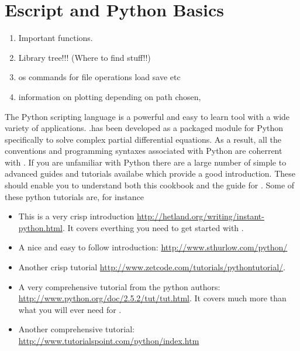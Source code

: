 
%
%
%

\section{Escript and Python Basics} \label{sec:escpybas}

\begin{enumerate}
 \item Important functions.
 \item Library tree!!! (Where to find stuff!!)
 \item os commands for file operations load save etc
 \item information on plotting depending on path chosen,
\end{enumerate}

The Python scripting language is a powerful and easy to learn tool with a wide variety of applications. \ESCRIPT.has been developed as a packaged module for Python specifically to solve complex partial differential equations. As a result, all the conventions and programming syntaxes associated with Python are coherrent with \ESCRIPT. If you are unfamiliar with Python there are a large number of simple to advanced guides and tutorials availabe which provide a good introduction. These should enable you to understand both this cookbook and the guide for \ESCRIPT. Some of these python tutorials are, for instance
\begin{itemize}
\item This is a very crisp introduction \url{http://hetland.org/writing/instant-python.html}. It covers everthing you need to get started with \ESCRIPT.
\item A nice and easy to follow introduction: \url{http://www.sthurlow.com/python/}
\item Another crisp tutorial \url{http://www.zetcode.com/tutorials/pythontutorial/}. 
 \item A very comprehensive tutorial from the python authors: \url{http://www.python.org/doc/2.5.2/tut/tut.html}. It covers much more than what you will ever need for \ESCRIPT.
\item Another comprehensive tutorial: \url{http://www.tutorialspoint.com/python/index.htm}
\end{itemize} 

